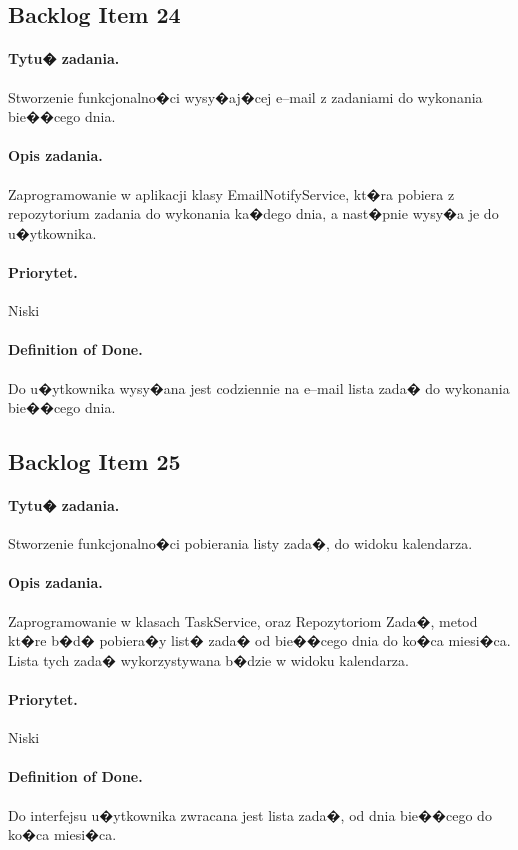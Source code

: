 ﻿\documentclass[a4paper]{article}
\begin{document}
\subsection{Backlog Item 24} 
\paragraph{Tytu� zadania.} Stworzenie funkcjonalno�ci wysy�aj�cej e--mail z zadaniami do wykonania bie��cego dnia.
\paragraph{Opis zadania.} Zaprogramowanie w aplikacji klasy EmailNotifyService, kt�ra pobiera z repozytorium zadania do wykonania ka�dego dnia, a nast�pnie wysy�a je do u�ytkownika.
\paragraph{Priorytet.} Niski
\paragraph{Definition of Done.} Do u�ytkownika wysy�ana jest codziennie na e--mail lista zada� do wykonania bie��cego dnia.


\subsection{Backlog Item 25} 
\paragraph{Tytu� zadania.}  Stworzenie funkcjonalno�ci pobierania listy zada�, do widoku kalendarza.
\paragraph{Opis zadania.} Zaprogramowanie w klasach TaskService, oraz Repozytoriom Zada�, metod kt�re b�d� pobiera�y list� zada� od bie��cego dnia do ko�ca miesi�ca. Lista tych zada� wykorzystywana b�dzie w widoku kalendarza.
\paragraph{Priorytet.} Niski
\paragraph{Definition of Done.} Do interfejsu u�ytkownika zwracana jest lista zada�, od dnia bie��cego do ko�ca miesi�ca. 
\end{document}
